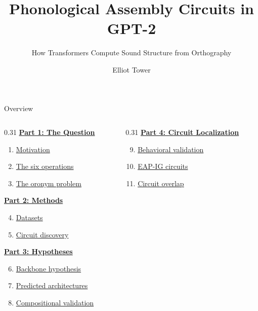 \documentclass[10pt,aspectratio=169]{beamer}
\title{Phonological Assembly Circuits in GPT-2}
\subtitle{How Transformers Compute Sound Structure from Orthography}
\author{Elliot Tower}
\date{}
\begin{document}
\begin{frame}[plain]
\maketitle
\end{frame}

\begin{frame}{Overview}
\hypertarget{sl:overview}{}

\begin{columns}[T]
\begin{column}{0.31\textwidth}
\textbf{\hyperlink{sl:motivation}{Part 1: The Question}}
\begin{enumerate}
  \item \hyperlink{sl:motivation}{Motivation}
  \item \hyperlink{sl:operations}{The six operations}
  \item \hyperlink{sl:oronym}{The oronym problem}
\end{enumerate}

\vspace{0.8em}
\textbf{\hyperlink{sl:datasets}{Part 2: Methods}}
\begin{enumerate}\setcounter{enumi}{3}
  \item \hyperlink{sl:datasets}{Datasets}
  \item \hyperlink{sl:discovery}{Circuit discovery}
\end{enumerate}

\vspace{0.8em}
\textbf{\hyperlink{sl:backbone}{Part 3: Hypotheses}}
\begin{enumerate}\setcounter{enumi}{5}
  \item \hyperlink{sl:backbone}{Backbone hypothesis}
  \item \hyperlink{sl:fusionheads}{Predicted architectures}
  \item \hyperlink{sl:composition}{Compositional validation}
\end{enumerate}
\end{column}

\begin{column}{0.31\textwidth}
\textbf{\hyperlink{sl:results}{Part 4: Circuit Localization}}
\begin{enumerate}\setcounter{enumi}{8}
  \item \hyperlink{sl:behavioral}{Behavioral validation}
  \item \hyperlink{sl:eapresults}{EAP-IG circuits}
  \item \hyperlink{sl:circuitoverlap}{Circuit overlap}
\end{enumerate}


\end{column}
\end{columns}
\end{frame}
\end{document}
